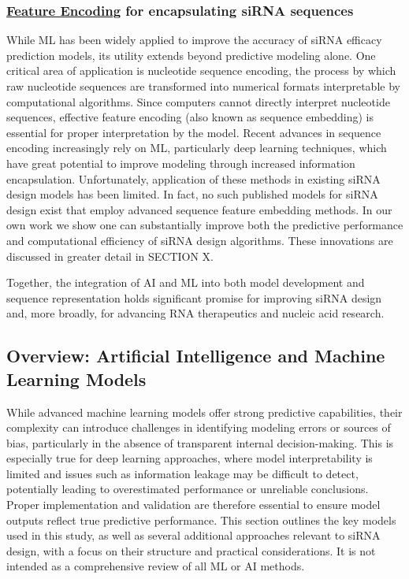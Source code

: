 \documentclass{report}
\begin{document}
\subsubsection{\underline{Feature Encoding} for encapsulating siRNA sequences}
While ML has been widely applied to improve the accuracy of siRNA efficacy prediction models, its utility extends beyond predictive modeling alone. One critical area of application is nucleotide sequence encoding, the process by which raw nucleotide sequences are transformed into numerical formats interpretable by computational algorithms. Since computers cannot directly interpret nucleotide sequences, effective feature encoding (also known as sequence embedding) is essential for proper interpretation by the model. Recent advances in sequence encoding increasingly rely on ML, particularly deep learning techniques, which have great potential to improve modeling through increased information encapsulation. Unfortunately, application of these methods in existing siRNA design models has been limited. In fact, no such published models for siRNA design exist that employ advanced sequence feature embedding methods. In our own work we show one can substantially improve both the predictive performance and computational efficiency of siRNA design algorithms. These innovations are discussed in greater detail in SECTION X. 

Together, the integration of AI and ML into both model development and sequence representation holds significant promise for improving siRNA design and, more broadly, for advancing RNA therapeutics and nucleic acid research.

\subsection{Overview:  Artificial Intelligence and Machine Learning Models}


While advanced machine learning models offer strong predictive capabilities, their complexity can introduce challenges in identifying modeling errors or sources of bias, particularly in the absence of transparent internal decision-making. This is especially true for deep learning approaches, where model interpretability is limited and issues such as information leakage may be difficult to detect, potentially leading to overestimated performance or unreliable conclusions. Proper implementation and validation are therefore essential to ensure model outputs reflect true predictive performance. This section outlines the key models used in this study, as well as several additional approaches relevant to siRNA design, with a focus on their structure and practical considerations. It is not intended as a comprehensive review of all ML or AI methods.
\end{document}
